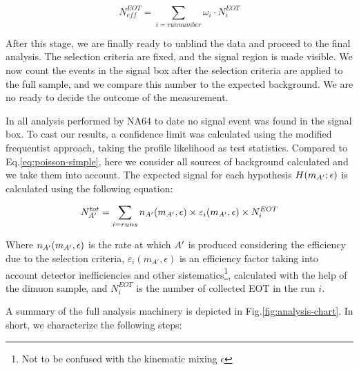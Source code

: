 \begin{equation}
  \label{eq:effective-eots}
  N_{eff}^{EOT} = \sum_{i=run number} \omega_i \cdot N^{EOT}_i
\end{equation}

After this stage, we are finally ready to unblind the data and proceed to the final analysis. The selection criteria are fixed, and the signal region is made visible. We now count the events in the signal box after the selection criteria are applied to the full sample, and we compare this number to the expected background. We are no ready to decide the outcome of the measurement.

In all analysis performed by NA64 to date \cite{Banerjee:2020fue,Banerjee:2019hmi,NA64:2019imj,na64-prd,Banerjee:2018vgk,Banerjee:2016tad} no signal event was found in the signal box. To cast our results, a confidence limit was calculated using the modified frequentist approach, taking the profile likelihood as test statistics\cite{JUNK1999435,Read_2002,Cowan:2010js}. Compared to Eq.\ref{eq:poisson-simple}, here we consider all sources of background calculated and we take them into account. The expected signal for each hypothesis $H(m_{A'};\epsilon)$ is calculated using the following equation:

\begin{equation}
  \label{eq:dm-expected-signal}
  N^{tot}_{A'} = \sum_{i=runs} n_{A'}(m_{A'},\epsilon) \times \varepsilon_i(m_{A'},\epsilon) \times N^{EOT}_i
\end{equation}

Where $n_{A'}(m_{A'},\epsilon)$ is the rate at which $A'$ is produced considering the efficiency due to the selection criteria, $\varepsilon_i(m_{A'},\epsilon)$ is an efficiency factor taking into account detector inefficiencies and other sistematics\footnote{Not to be confused with the kinematic mixing $\epsilon$}, calculated with the help of the dimuon sample, and $N^{EOT}_i$ is the number of collected EOT in the run $i$.

A summary of the full analysis machinery is depicted in Fig.\ref{fig:analysis-chart}. In short, we characterize the following steps:

